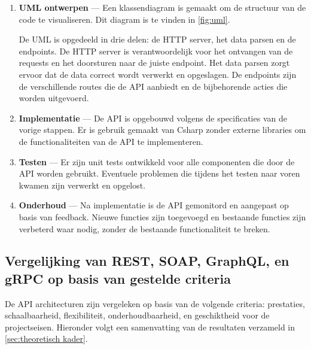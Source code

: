 \begin{enumerate}
\begin{itemize}
    \begin{verbatim}
    {
      "id": "<string>",
      "objects": "<Array<Array<int, int>>>"
    }
    \end{verbatim}
    \textbf{Return Body:}
    \begin{verbatim}
    {
      "message": "<success|fail>",
      "id": "<string>",
    }
    \end{verbatim}
    Voegt een nieuwe geplande route toe aan de database.
    \item \textbf{POST /api/v1/roomba/control}
    \linebreak \textbf{Request Body:}
    \begin{verbatim}
    {
      "command": "<string>"
    }
    \end{verbatim}
    Proxies het commando naar de Roomba.
  \end{itemize}
  \item \textbf{UML ontwerpen} --- Een klassendiagram is gemaakt om de structuur
  van de code te visualiseren. Dit diagram is te vinden in \autoref{fig:uml}.

  De UML is opgedeeld in drie delen: de HTTP server, het data parsen en de endpoints.
  De HTTP server is verantwoordelijk voor het ontvangen van de requests en het
  doorsturen naar de juiste endpoint. Het data parsen zorgt ervoor dat de data
  correct wordt verwerkt en opgeslagen. De endpoints zijn de verschillende routes
  die de API aanbiedt en de bijbehorende acties die worden uitgevoerd.
  \item \textbf{Implementatie} --- De API is opgebouwd volgens de specificaties
  van de vorige stappen. Er is gebruik gemaakt van Csharp zonder externe libraries
  om de functionaliteiten van de API te implementeren.
  \item \textbf{Testen} --- Er zijn unit tests ontwikkeld voor alle componenten
  die door de API worden gebruikt. Eventuele problemen die tijdens het testen naar
  voren kwamen zijn verwerkt en opgelost.
  \item \textbf{Onderhoud} --- Na implementatie is de API gemonitord en aangepast
  op basis van feedback. Nieuwe functies zijn toegevoegd en bestaande functies
  zijn verbeterd waar nodig, zonder de bestaande functionaliteit te breken.
\end{enumerate}

\subsection{Vergelijking van REST, SOAP, GraphQL, en gRPC op basis van gestelde criteria}
De API architecturen zijn vergeleken op basis van de volgende criteria:
prestaties, schaalbaarheid, flexibiliteit, onderhoudbaarheid, en geschiktheid
voor de projectseisen.
Hieronder volgt een samenvatting van de resultaten verzameld in
\autoref{sec:theoretisch kader}.

